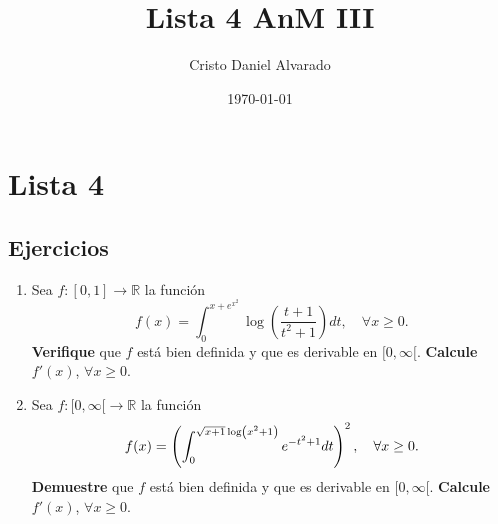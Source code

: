 \documentclass[12pt]{report}
\theoremstyle{largebreak}
\begin{document}
    \setlength{\parskip}{5pt} %
    \setlength{\parindent}{12pt} %
    \title{Lista 4 AnM III}
    \author{Cristo Daniel Alvarado}
    \date{\today}
    \maketitle

    \renewcommand{\theenumi}{\Roman{enumi}}

    \tableofcontents
    \chapter{Lista 4}

\section{Ejercicios}
    \begin{excer}
        \begin{enumerate}
            \item Sea $f:[0,1]\rightarrow \mathbb{R}$ la función
            \begin{equation*}
                f(x)=\int_{0}^{x+e^{x^2}}\log\left(\frac{t+1}{t^2+1}\right)dt,\quad\forall x\geq0.
            \end{equation*}
            \textbf{Verifique} que $f$ está bien definida y que es derivable en $[0,\infty[$. \textbf{Calcule} $f'(x)$, $\forall x\geq 0$.
            \item Sea $f:[0,\infty[\rightarrow\mathbb{R}$ la función
            \begin{equation*}
                f(x)=\left(\int_{0}^{\sqrtsign{x+1}\log\left(x^2+1\right)}e^{-t^2+1}dt\right)^2, \quad \forall x\geq0.
            \end{equation*}
            \textbf{Demuestre} que $f$ está bien definida y que es derivable en $[0,\infty[$. \textbf{Calcule} $f'(x)$, $\forall x\geq 0$.
        \end{enumerate}
    \end{excer}
    
\end{document}
